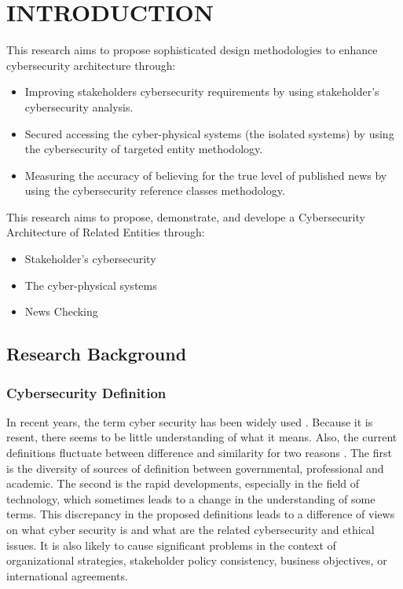 \chapter{INTRODUCTION}

\if 
This research aims to propose sophisticated design methodologies to enhance cybersecurity architecture through:
\begin{itemize}
\item Improving stakeholders cybersecurity requirements by using stakeholder's cybersecurity analysis.
\item Secured accessing
the cyber-physical systems (the isolated systems) by using the cybersecurity of targeted entity methodology.
\item Measuring the accuracy of believing for the true level of published news by using the cybersecurity reference classes methodology. 
\end{itemize} \fi
\if
This research aims to propose,  demonstrate, and develope a Cybersecurity Architecture of Related Entities through:
\begin{itemize}
\item Stakeholder's cybersecurity  %
\item  The cyber-physical systems %
\item  News Checking %
\end{itemize}
\fi


\section{Research Background}
\subsection{Cybersecurity Definition}
In recent years, the term cyber security has been widely used \cite{craigen2014defining,schatz2017towards,giles2013divided}. Because it is resent, there seems to be little understanding of what it means. Also, the current definitions fluctuate between difference and similarity for two reasons \cite{schatz2017towards}. The first is the diversity of sources of definition between governmental, professional and academic. The second is the rapid developments, especially in the field of technology, which sometimes leads to a change in the understanding of some terms. This discrepancy in the proposed definitions leads to a difference of views on what cyber security is and what are the related cybersecurity and ethical issues. It is also likely to cause significant problems in the context of organizational strategies, stakeholder policy consistency, business objectives, or international agreements. 

